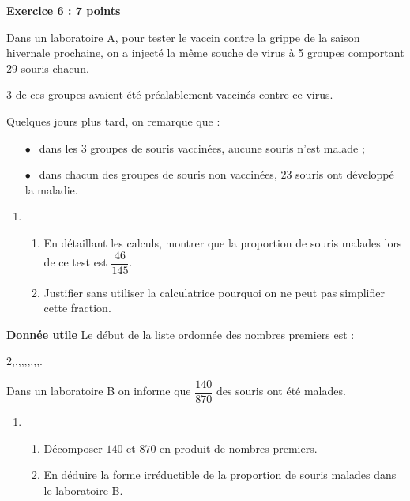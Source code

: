 \documentclass[10pt]{article}
\begin{document}
\vspace{0,5cm}

\textbf{Exercice 6 :  \hfill 7 points}

\medskip

Dans un laboratoire A, pour tester le vaccin contre la grippe de la saison hivernale prochaine, on a injecté la même souche de virus à 5 groupes comportant 29 souris chacun.

3 de ces groupes avaient été préalablement vaccinés contre ce virus.

Quelques jours plus tard, on remarque que :

\setlength\parindent{10mm}
\begin{itemize}
\item[$\bullet~~$] dans les $3$ groupes de souris vaccinées, aucune souris n'est malade ;
\item[$\bullet~~$] dans chacun des groupes de souris non vaccinées, $23$ souris ont développé la maladie.
\end{itemize}
\setlength\parindent{0mm} 

\medskip
 
\begin{enumerate}
\item 
	\begin{enumerate}
		\item En détaillant les calculs, montrer que la proportion de souris malades lors de ce test est $\dfrac{46}{145}$.
		\item Justifier sans utiliser la calculatrice pourquoi on ne peut pas simplifier cette fraction.
	\end{enumerate}	
\end{enumerate}
		
\textbf{Donnée utile} Le début de la liste ordonnée des nombres premiers est : 
		
		2,,,,,,,,,.
		
Dans un laboratoire B on informe que $\dfrac{140}{870}$ des souris ont été malades.

\begin{enumerate}[resume]		
\item  
	\begin{enumerate}
		\item Décomposer $140$ et $870$ en produit de nombres premiers.
		\item En déduire la forme irréductible de la proportion de souris malades dans le laboratoire B.
	\end{enumerate}
\end{enumerate}
\end{document}
